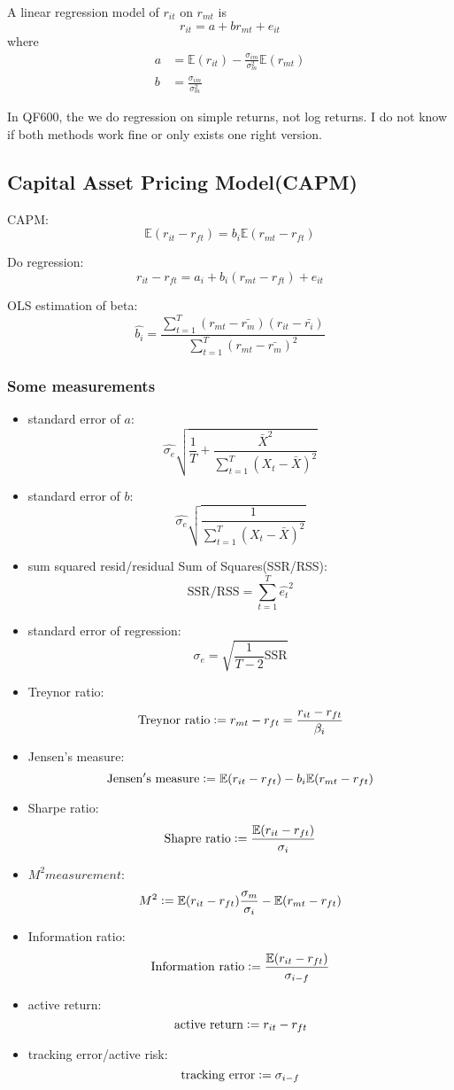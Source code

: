 A linear regression model of $r_{it}$ on $r_{mt}$ is 
\[
  r_{it} = a + br_{mt} + e_{it}
\]
where 
\[
  \begin{aligned}
    a &= \mathbb{E}(r_{it}) - \frac{\sigma_{im}}{\sigma_m^2}\mathbb{E}(r_{mt})\\
    b &= \frac{\sigma_{im}}{\sigma_m^2}
  \end{aligned}
\]
\begin{remark}
  In QF600, the we do regression on simple returns, not log returns. I do not know if both methods work fine or only exists one right version. 
\end{remark}
\subsection{Capital Asset Pricing Model(CAPM)}
CAPM:
\[
  \mathbb{E}(r_{it}-r_{ft}) = b_i\mathbb{E}(r_{mt}-r_{ft})
\]

Do regression:
\[
  r_{it} - r_{ft} = a_i + b_i(r_{mt}-r_{ft}) + e_{it}
\]

OLS estimation of beta:
\[
  \hat{b_i} = \frac{\sum_{t=1}^T(r_{mt}-\bar{r_m})(r_{it}-\bar{r_i})}{\sum_{t=1}^T(r_{mt}-\bar{r_m})^2}
\]

\subsubsection{Some measurements}
\begin{itemize}
  \item standard error of $a$:
    \[
      \hat{\sigma_e}\sqrt{\frac{1}{T}+\frac{\bar{X}^2}{\sum_{t=1}^T(X_t-\bar{X})^2}}
    \]
  \item standard error of $b$:
    \[
      \hat{\sigma_e}\sqrt{\frac{1}{\sum_{t=1}^T(X_t-\bar{X})^2}}
    \]
  \item sum squared resid/residual Sum of Squares(SSR/RSS):
  \[
    \mathrm{SSR/RSS} = \sum_{t=1}^T\hat{e_t}^2
  \]
  \item standard error of regression:
  \[
    \sigma_e = \sqrt{\frac{1}{T-2}\mathrm{SSR}}
  \]
  \item Treynor ratio:
  \[
    \mathrm{Treynor\ ratio} \defeq  r_{mt} - r_{ft} = \frac{r_{it}-r_{ft}}{\beta_i}
  \]
  \item Jensen's measure:
  \[
    \mathrm{Jensen's \ measure} \defeq \mathbb{E}(r_{it}-r_{ft}) - b_i\mathbb{E}(r_{mt}-r_{ft})
  \]
  \item Sharpe ratio:
  \[
    \mathrm{Shapre \ ratio} \defeq  \frac{\mathbb{E}(r_{it}-r_{ft})}{\sigma_i} 
  \]
  \item $M^2 measurement$:
  \[
    M^2 \vcentcolon= \mathbb{E} (r_{it}-r_{ft})\frac{\sigma_m}{\sigma_i} - \mathbb{E} (r_{mt}-r_{ft})
  \]
  \item Information ratio:
  \[
    \mathrm{Information\ ratio} \vcentcolon= \frac{\mathbb{E} (r_{it}-r_{ft})}{\sigma_{i-f}}
  \]
  \item active return:
  \[
    \mathrm{active\ return} \defeq r_{it} - r_{ft}
  \]
  \item tracking error/active risk:
  \[
    \mathrm{tracking\ error} \vcentcolon= \sigma_{i-f}
  \]
\end{itemize}
